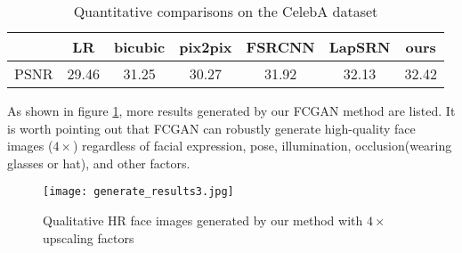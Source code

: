 \documentclass[conference,compsoc]{IEEEtran}
\begin{document}
\begin{table}
  \caption{Quantitative comparisons on the CelebA dataset}
    \label{tab:PSNR}
  \begin{tabular}{ccccccc}
    \toprule
    & LR & bicubic & pix2pix & FSRCNN & LapSRN & ours \\
    \midrule
  PSNR & 29.46 & 31.25 & 30.27 & 31.92 & 32.13 & 32.42 \\
    \bottomrule
\end{tabular}
\end{table}


As shown in figure \ref{Fig:gene_results}, more results generated by our FCGAN method are listed. It is worth pointing out that FCGAN can robustly generate high-quality face images ($4 \times$) regardless of facial expression, pose, illumination, occlusion(wearing glasses or hat), and other factors.

\begin{figure}[h]
  \centering
  \texttt{[image: generate\_results3.jpg]}
  \caption{Qualitative HR face images generated by our method with $4\times$ upscaling factors}
  \label{Fig:gene_results}
\end{figure}




%
%
\end{document}
